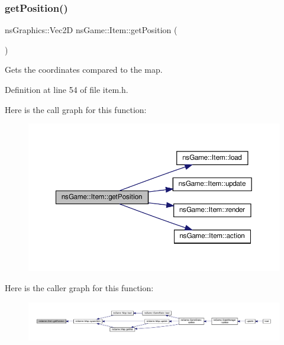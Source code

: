 \subsubsection{\texorpdfstring{get\+Position()}{getPosition()}}
{\footnotesize\ttfamily ns\+Graphics\+::\+Vec2D ns\+Game\+::\+Item\+::get\+Position (\begin{DoxyParamCaption}{ }\end{DoxyParamCaption})\hspace{0.3cm}{\ttfamily [inline]}}



Gets the coordinates compared to the map. 



Definition at line 54 of file item.\+h.

Here is the call graph for this function\+:\nopagebreak
\begin{figure}[H]
\begin{center}
\leavevmode
\includegraphics[width=350pt]{structns_game_1_1_item_abd124b5001b8dc63b8513e5b85c6c2b9_cgraph}
\end{center}
\end{figure}
Here is the caller graph for this function\+:\nopagebreak
\begin{figure}[H]
\begin{center}
\leavevmode
\includegraphics[width=350pt]{structns_game_1_1_item_abd124b5001b8dc63b8513e5b85c6c2b9_icgraph}
\end{center}
\end{figure}
\mbox{\label{structns_game_1_1_item_a69156550e5083928cbb673ca2db671f5}} 
